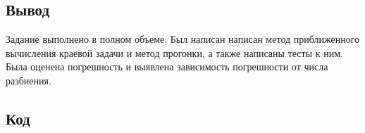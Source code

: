 \documentclass[a4paper,12pt]{article}
\begin{document}
	\subsection{Вывод}
	Задание выполнено в полном объеме.
	Был написан написан метод приближенного вычисления краевой задачи и метод прогонки, а также написаны тесты к ним.
	Была оценена погрешность и выявлена зависимость погрешности от числа разбиения.
	\newpage
	\subsection{Код}
	\inputminted{c++}{../lab1/src/main.cpp}
	\inputminted{c++}{../lab1/src/data_table.hpp}
	\inputminted{c++}{../lab1/include/tma.hpp}
	\inputminted{c++}{../lab1/include/balance.hpp}
	\inputminted{c++}{../lab1/include/utils.hpp}
	\inputminted{c++}{../lab1/include/utils/balance_utils.hpp}
	\inputminted{c++}{../lab1/include/utils/data.hpp}
	\inputminted{c++}{../lab1/include/utils/grid.hpp}
	\inputminted{c++}{../lab1/test/test_tma.cpp}
	\inputminted{c++}{../lab1/test/test_utils.hpp}
\end{document}
